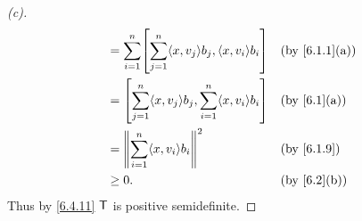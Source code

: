 \begin{proof}[(c)]
\begin{align*}
     & = \sum_{i = 1}^n \br{\sum_{j = 1}^n \inn{x, v_j} b_j, \inn{x, v_i} b_i}                                &  & \by{6.1.1}[a]          \\
     & = \br{\sum_{j = 1}^n \inn{x, v_j} b_j, \sum_{i = 1}^n \inn{x, v_i} b_i}                                &  & \by{6.1}[a]            \\
     & = \norm{\sum_{i = 1}^n \inn{x, v_i} b_i}^2                                                             &  & \by{6.1.9}             \\
     & \geq 0.                                                                                                &  & \by{6.2}[b]
  \end{align*}
  Thus by \cref{6.4.11} \(\mathsf{T}\) is positive semidefinite.
\end{proof}

